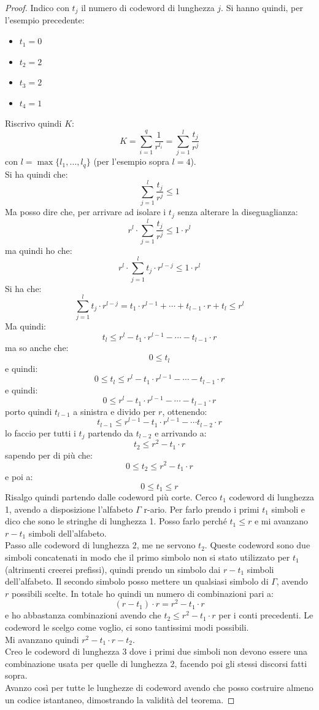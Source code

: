 \documentclass[a4paper,12pt, oneside]{book}
\begin{document}
\begin{proof}
  Indico con $t_j$ il numero di codeword di lunghezza $j$. Si hanno quindi, per
  l'esempio precedente:
  \begin{itemize}
    \item $t_1=0$
    \item $t_2=2$
    \item $t_3=2$
    \item $t_4=1$
  \end{itemize}
  Riscrivo quindi $K$:
  \[K=\sum_{i=1}^q\frac{1}{r^{l_i}}=\sum_{j=1}^l\frac{t_j}{r^{j}}\]
  con $l=\max\{l_1,\ldots,l_q\}$ (per l'esempio sopra $l=4$).\\
  Si ha quindi che:
  \[\sum_{j=1}^l\frac{t_j}{r^{j}}\leq 1\]
  Ma posso dire che, per arrivare ad isolare i $t_j$ senza alterare la
  diseguaglianza: 
  \[r^l\cdot \sum_{j=1}^l\frac{t_j}{r^{j}}\leq 1\cdot r^l\]
  ma quindi ho che:
  \[r^l\cdot \sum_{j=1}^lt_j\cdot r^{l-j}\leq 1\cdot r^l\]
  Si ha che:
  \[ \sum_{j=1}^lt_j\cdot r^{l-j}= t_1\cdot r^{l-1}+\cdots+t_{l-1}\cdot
    r+t_l\leq r^l\]
  Ma quindi:
  \[t_l\leq r^l- t_1\cdot r^{l-1}-\cdots-t_{l-1}\cdot r\]
  ma so anche che:
  \[0\leq t_l\]
  e quindi:
  \[0\leq t_l\leq r^l- t_1\cdot r^{l-1}-\cdots-t_{l-1}\cdot r\]
  e quindi:
  \[0\leq r^l- t_1\cdot r^{l-1}-\cdots-t_{l-1}\cdot r\]
  porto quindi $t_{l-1}$ a sinistra e divido per $r$, ottenendo:
  \[t_{l-1}\leq r^{l-1}-t_1\cdot r^{l-1}-\cdots t_{l-2}\cdot r\]
  lo faccio per tutti i $t_j$ partendo da $t_{l-2}$ e arrivando a:
  \[t_2\leq r^2-t_1\cdot r\]
  sapendo per di più che:
  \[0\leq t_2\leq r^2-t_1\cdot r\]
  e poi a:
  \[0\leq t_1\leq r\]
  Risalgo quindi partendo dalle codeword più corte. Cerco $t_1$ codeword di
  lunghezza 1, avendo a disposizione l'alfabeto $\Gamma$ r-ario. Per farlo
  prendo i primi $t_1$ simboli e dico che sono le stringhe di lunghezza 1. Posso
  farlo perché $t_1\leq r$ e mi avanzano $r-t_1$ simboli dell'alfabeto.\\
  Passo alle codeword di lunghezza 2, me ne servono $t_2$. Queste codeword sono
  due simboli concatenati in modo che il primo simbolo non si stato utilizzato
  per $t_1$ (altrimenti creerei prefissi), quindi prendo un simbolo dai $r-t_1$
  simboli dell'alfabeto. Il secondo simbolo posso mettere un qualsiasi simbolo
  di $\Gamma$, avendo $r$ possibili scelte. In totale ho quindi un numero di
  combinazioni pari a:
  \[(r-t_1)\cdot r=r^2-t_1\cdot r\]
  e ho abbastanza combinazioni avendo che $t_2\leq r^2-t_1\cdot r$ per i conti
  precedenti. Le codeword le scelgo come voglio, ci sono tantissimi modi
  possibili.\\  
  Mi avanzano quindi $r^2-t_1\cdot r-t_2$.\\
  Creo le codeword di lunghezza 3 dove i primi due simboli non devono essere una
  combinazione usata per quelle di lunghezza 2, facendo poi gli stessi discorsi
  fatti sopra. \\
  Avanzo così per tutte le lunghezze di codeword avendo che posso costruire
  almeno un codice istantaneo, dimostrando la validità del teorema.
\end{proof}
\end{document}
